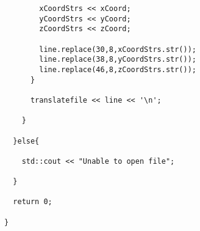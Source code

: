 \documentclass[11pt]{article}
\begin{document}
\begin{lstlisting}
        xCoordStrs << xCoord;
        yCoordStrs << yCoord;
        zCoordStrs << zCoord;

        line.replace(30,8,xCoordStrs.str());
        line.replace(38,8,yCoordStrs.str());
        line.replace(46,8,zCoordStrs.str());
      }

      translatefile << line << '\n';

    }

  }else{

    std::cout << "Unable to open file";

  }

  return 0;

}

\end{lstlisting}
\end{document}
